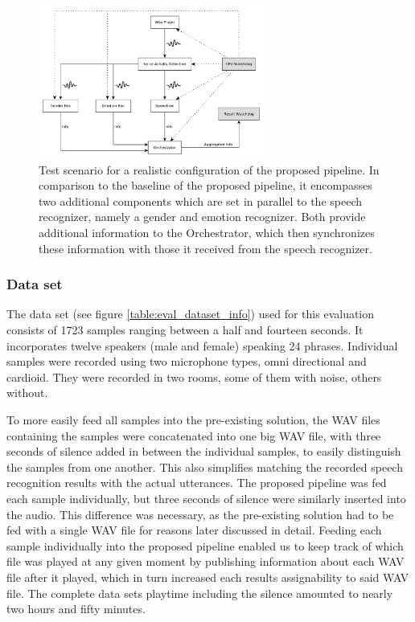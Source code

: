 \begin{figure}[]
	\centering
	\includegraphics[width=0.66\textwidth]{diagrams/eval_pipeline_5.pdf}
	\caption{Test scenario for a realistic configuration of the proposed pipeline.
		In comparison to the baseline of the proposed pipeline, it encompasses two additional components which are set in parallel to the speech recognizer, namely a gender and emotion recognizer.
		Both provide additional information to the Orchestrator, which then synchronizes these information with those it received from the speech recognizer.}
	\label{pic:eval_p5_diag}
\end{figure}

\subsubsection{Data set}
\label{eval:dataset:dataset}

The data set (see figure \ref{table:eval_dataset_info}) used for this evaluation consists of 1723 samples ranging between a half and fourteen seconds.
It incorporates twelve speakers (male and female) speaking 24 phrases. 
Individual samples were recorded using two microphone types, omni directional and cardioid.
They were recorded in two rooms, some of them with noise, others without.

To more easily feed all samples into the pre-existing solution, the WAV files containing the samples were concatenated into one big WAV file, with three seconds of silence added in between the individual samples, to easily distinguish the samples from one another.
This also simplifies matching the recorded speech recognition results with the actual utterances.
The proposed pipeline was fed each sample individually, but three seconds of silence were similarly inserted into the audio.
This difference was necessary, as the pre-existing solution had to be fed with a single WAV file for reasons later discussed in detail.
Feeding each sample individually into the proposed pipeline enabled us to keep track of which file was played at any given moment by publishing information about each WAV file after it played, which in turn increased each results assignability to said WAV file.
The complete data sets playtime including the silence amounted to nearly two hours and fifty minutes.


